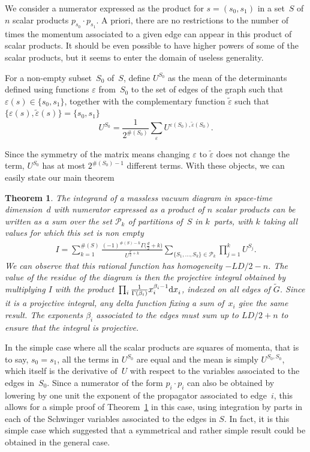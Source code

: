 \documentclass[pdftex]{sigma}
\numberwithin{equation}{section}
\newtheorem{Theorem}{Theorem}[section]
\let\veps\varepsilon
\begin{document}
We consider a numerator expressed as the product for $s=(s_0,s_1)$ in a set~$S$ of $n$ scalar
products $p_{s_0} \cdot p_{s_1}$. A priori, there are no restrictions to the number of times the momentum
associated to a given edge can appear in this product of scalar products. It should be even possible to have higher
powers of some of the scalar products, but it seems to enter the domain of useless generality.
\begin{Definition}
For a non-empty subset~$S_0$ of~$S$, define $U^{S_0}$ as the mean of the determinants defined using
functions $\veps$ from~$S_0$ to the set of edges of the graph such that
$\veps(s) \in \{s_0,s_1\}$, together with the complementary function
$\tilde\veps$ such that $\{\veps(s),\tilde\veps(s)\} =
\{s_0,s_1\}$
\[
	U^{S_0} = \frac1 {2^{\#(S_0)}} \sum_{\veps} U^{\veps(S_0), \tilde\veps(S_0)}.
\]
\end{Definition}
Since the symmetry of the matrix means changing $\veps$
to $\tilde\veps$ does not change the term, $U^{S_0}$ has at most
$2^{\#(S_0)-1}$ different terms. With these objects, we can easily state our main theorem
\begin{Theorem}\label{fund}
The integrand of a massless vacuum diagram in space-time dimension~$d$ with numerator expressed
as a product of $n$ scalar products can be written as a sum over the set
$\mathcal P_k$ of partitions of~$S$ in $k$~parts, with $k$ taking all values for which this set is
non empty
\begin{gather*}
	I = \sum_{k=1}^{\#(S)} \frac{(-1)^{\#(S)-k}\Gamma\bigl(\frac d2 + k\bigr)}{U^{\frac d2 +k} }
			\sum_{\{S_1,\ldots,S_k\} \in \mathcal P_k} \prod_{j=1}^k U^{S_j}.
\end{gather*}
We can observe that this rational function has homogeneity $-L D/2 - n$.
The value of the residue of the diagram is then the projective integral obtained by multiplying $I$ with the
product~${\prod_i \frac 1{\Gamma(\beta_i)} x_i^{\beta_i-1} {\rm d }x_i^{\vphantom{\beta_i}}}$,
indexed on all edges of $\tilde G$. Since it is a projective integral, any delta function fixing a sum
of~$x_i$ give the same result. The exponents $\beta_i$ associated to the edges must sum up to $L D/2 + n$ to ensure that the integral is
projective.
\end{Theorem}

In the simple case where all the scalar products are squares of momenta, that is to
say, $s_0 = s_1$, all the terms in $U^{S_0}$ are equal and the mean is simply
$U^{S_0,S_0}$, which itself is the derivative of~$U$ with
respect to the variables associated to the edges in~$S_0$. Since a numerator of the
form $p_i\cdot p_i$ can also be obtained by lowering by one unit the exponent of
the propagator associated to edge~$i$, this allows for a simple proof of
Theorem~\ref{fund} in this case, using integration by parts in each of the Schwinger variables associated to the edges in
$S$. In fact, it is this
simple case which suggested that a symmetrical and rather simple result could be
obtained in the general case.
\end{document}
